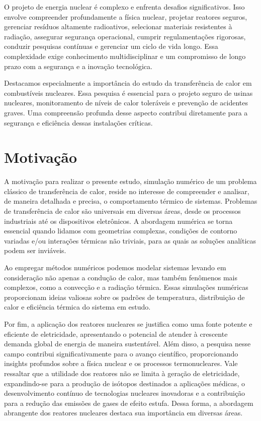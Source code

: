 O projeto de energia nuclear é complexo e enfrenta desafios significativos. Isso envolve compreender profundamente a física nuclear, projetar reatores seguros, gerenciar resíduos altamente radioativos, selecionar materiais resistentes à radiação, assegurar segurança operacional, cumprir regulamentações rigorosas, conduzir pesquisas contínuas e gerenciar um ciclo de vida longo. Essa complexidade exige conhecimento multidisciplinar e um compromisso de longo prazo com a segurança e a inovação tecnológica.

Destacamos especialmente a importância do estudo da transferência de calor em combustíveis nucleares. Essa pesquisa é essencial para o projeto seguro de usinas nucleares, monitoramento de níveis de calor toleráveis e prevenção de acidentes graves. Uma compreensão profunda desse aspecto contribui diretamente para a segurança e eficiência dessas instalações críticas.

\section{Motivação}

A motivação para realizar o presente estudo, simulação numérico de um problema clássico de transferência de calor, reside no interesse de compreender e analisar, de maneira detalhada e precisa, o comportamento térmico de sistemas. Problemas de transferência de calor são universais em diversas áreas, desde os processos industriais até os dispositivos eletrônicos. A abordagem numérica se torna essencial quando lidamos com geometrias complexas, condições de contorno variadas e/ou interações térmicas não triviais, para as quais as soluções analíticas podem ser inviáveis.

Ao empregar métodos numéricos podemos modelar sistemas levando em consideração não apenas a condução de calor, mas também fenômenos mais complexos, como a convecção e a radiação térmica. Essas simulações numéricas proporcionam ideias valiosas sobre os padrões de temperatura, distribuição de calor e eficiência térmica do sistema em estudo.

Por fim, a aplicação dos reatores nucleares se justifica como uma fonte potente e eficiente de eletricidade, apresentando o potencial de atender à crescente demanda global de energia de maneira sustentável. Além disso, a pesquisa nesse campo contribui significativamente para o avanço científico, proporcionando insights profundos sobre a física nuclear e os processos termonucleares. Vale ressaltar que a utilidade dos reatores não se limita à geração de eletricidade, expandindo-se para a produção de isótopos destinados a aplicações médicas, o desenvolvimento contínuo de tecnologias nucleares inovadoras e a contribuição para a redução das emissões de gases de efeito estufa. Dessa forma, a abordagem abrangente dos reatores nucleares destaca sua importância em diversas áreas.

